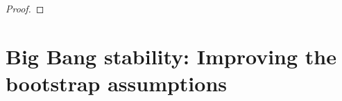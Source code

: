 \documentclass[11pt,leqno,textwidth=10cm]{amsart}
\numberwithin{equation}{section}
\theoremstyle{definition}
\theoremstyle{plain}
\newcommand{\1}{\mathbbm{1}}
\newcommand{\vol}[1]{{\text{\normalfont{vol}}}_{#1}}
\renewcommand{\epsilon}{\varepsilon}
\newcommand{\del}{\partial}
\begin{document}
\begin{proof}
\end{proof}

\section{Big Bang stability: Improving the bootstrap assumptions}\label{sec:bs-imp}
\end{document}
